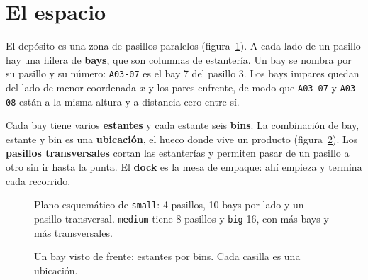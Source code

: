 \documentclass[11pt,a4paper,oneside]{report}
\newcommand{\code}[1]{\texttt{\small #1}}
\begin{document}
\section{El espacio}

El depósito es una zona de pasillos paralelos (figura~\ref{fig:layout}). A cada lado de un
pasillo hay una hilera de \textbf{bays}, que son columnas de estantería. Un bay se nombra por
su pasillo y su número: \code{A03-07} es el bay 7 del pasillo 3. Los bays impares quedan del
lado de menor coordenada $x$ y los pares enfrente, de modo que \code{A03-07} y \code{A03-08}
están a la misma altura y a distancia cero entre sí.

Cada bay tiene varios \textbf{estantes} y cada estante seis \textbf{bins}. La combinación de
bay, estante y bin es una \textbf{ubicación}, el hueco donde vive un producto
(figura~\ref{fig:bay}). Los \textbf{pasillos transversales} cortan las estanterías y
permiten pasar de un pasillo a otro sin ir hasta la punta. El \textbf{dock} es la mesa de
empaque: ahí empieza y termina cada recorrido.

\begin{figure}[ht]
\centering
{}
\caption{Plano esquemático de \code{small}: 4 pasillos, 10 bays por lado y un pasillo
transversal. \code{medium} tiene 8 pasillos y \code{big} 16, con más bays y más
transversales.}
\label{fig:layout}
\end{figure}

\begin{figure}[ht]
\centering
{}
\caption{Un bay visto de frente: estantes por bins. Cada casilla es una ubicación.}
\label{fig:bay}
\end{figure}
\end{document}
